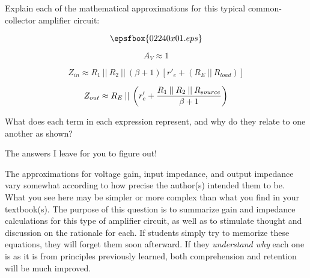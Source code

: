 

Explain each of the mathematical approximations for this typical common-collector amplifier circuit:

$$\epsfbox{02240x01.eps}$$

$$A_V \approx 1$$

$$Z_{in} \approx R_1 \> || \> R_2 \> || \> (\beta + 1)[r'_e + (R_E \> || \> R_{load})]$$

$$Z_{out} \approx R_E \> || \> \left( r'_e + {{R_1 \> || \> R_2 \> || \> R_{source}} \over {\beta + 1}} \right) $$

What does each term in each expression represent, and why do they relate to one another as shown?







The answers I leave for you to figure out!







The approximations for voltage gain, input impedance, and output impedance vary somewhat according to how precise the author(s) intended them to be.  What you see here may be simpler or more complex than what you find in your textbook(s).  The purpose of this question is to summarize gain and impedance calculations for this type of amplifier circuit, as well as to stimulate thought and discussion on the rationale for each.  If students simply try to memorize these equations, they will forget them soon afterward.  If they {\it understand why} each one is as it is from principles previously learned, both comprehension and retention will be much improved.




